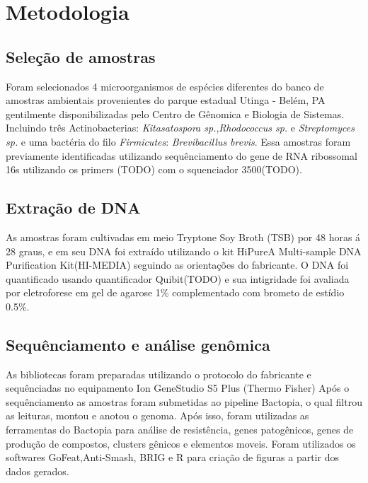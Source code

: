 \chapter{Metodologia}
\section{Seleção de amostras}
Foram selecionados 4 microorganismos de espécies diferentes do banco de amostras ambientais provenientes
do parque estadual Utinga - Belém, PA gentilmente disponibilizadas pelo Centro de Gênomica e Biologia de Sistemas.
Incluindo três Actinobacterias: \textit{Kitasatospora sp.},\textit{Rhodococcus sp.} e \textit{Streptomyces sp.}
e uma bactéria do filo \textit{Firmicutes}: \textit{Brevibacillus brevis}.
Essa amostras foram previamente identificadas utilizando sequênciamento do gene de RNA ribossomal 16s
utilizando os primers (TODO) com o squenciador 3500(TODO).

\section{Extração de DNA}
As amostras foram cultivadas em meio Tryptone Soy Broth (TSB) por 48 horas á 28 graus, e em
seu DNA foi extraído utilizando o kit HiPureA Multi-sample DNA Purification Kit(HI-MEDIA) seguindo as orientações
do fabricante. O DNA foi quantificado usando quantificador Quibit(TODO) e sua intigridade foi 
avaliada por eletroforese em gel de agarose 1\% complementado com brometo de estídio 0.5\%.

\section{Sequênciamento e análise genômica}
As bibliotecas foram preparadas utilizando o protocolo do fabricante e sequênciadas no equipamento
Ion GeneStudio S5 Plus (Thermo Fisher)
Após o sequênciamento as amostras foram submetidas ao pipeline Bactopia, o qual filtrou
as leituras, montou e anotou o genoma. Após isso, foram utilizadas as ferramentas do Bactopia 
para análise de resistência, genes patogênicos, genes de produção de compostos, clusters
gênicos e elementos moveis. 
Foram utilizados os softwares GoFeat,Anti-Smash, BRIG e R para criação de figuras a partir dos dados gerados.
